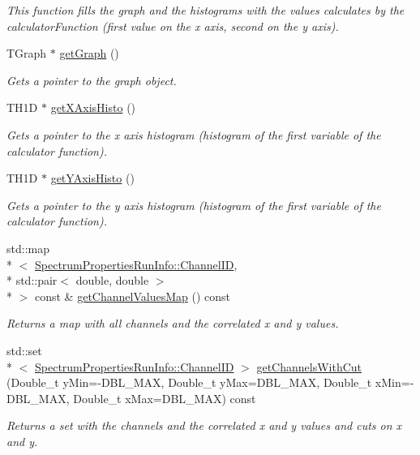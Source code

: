 \begin{DoxyCompactItemize}
\begin{DoxyCompactList}\small\item\em This function fills the graph and the histograms with the values calculates by the calculator\-Function (first value on the x axis, second on the y axis). \end{DoxyCompactList}\item 
T\-Graph $\ast$ \hyperlink{class_run_comparator_a75e708544897139bec4a7b11dc66925b}{get\-Graph} ()
\begin{DoxyCompactList}\small\item\em Gets a pointer to the graph object. \end{DoxyCompactList}\item 
T\-H1\-D $\ast$ \hyperlink{class_run_comparator_aa7db01e7789d70087584da1d3e6c281e}{get\-X\-Axis\-Histo} ()
\begin{DoxyCompactList}\small\item\em Gets a pointer to the x axis histogram (histogram of the first variable of the calculator function). \end{DoxyCompactList}\item 
T\-H1\-D $\ast$ \hyperlink{class_run_comparator_a91ce139df30b4af12e1d64d3421ff570}{get\-Y\-Axis\-Histo} ()
\begin{DoxyCompactList}\small\item\em Gets a pointer to the y axis histogram (histogram of the first variable of the calculator function). \end{DoxyCompactList}\item 
std\-::map\\*
$<$ \hyperlink{class_spectrum_properties_run_info_1_1_channel_i_d}{Spectrum\-Properties\-Run\-Info\-::\-Channel\-I\-D}, \\*
std\-::pair$<$ double, double $>$\\*
 $>$ const \& \hyperlink{class_run_comparator_a47854c2f02d9632b0c9cd004820fee20}{get\-Channel\-Values\-Map} () const 
\begin{DoxyCompactList}\small\item\em Returns a map with all channels and the correlated x and y values. \end{DoxyCompactList}\item 
std\-::set\\*
$<$ \hyperlink{class_spectrum_properties_run_info_1_1_channel_i_d}{Spectrum\-Properties\-Run\-Info\-::\-Channel\-I\-D} $>$ \hyperlink{class_run_comparator_a3d58b62450dcc496322872f01774ce68}{get\-Channels\-With\-Cut} (Double\-\_\-t y\-Min=-\/D\-B\-L\-\_\-\-M\-A\-X, Double\-\_\-t y\-Max=D\-B\-L\-\_\-\-M\-A\-X, Double\-\_\-t x\-Min=-\/D\-B\-L\-\_\-\-M\-A\-X, Double\-\_\-t x\-Max=D\-B\-L\-\_\-\-M\-A\-X) const 
\begin{DoxyCompactList}\small\item\em Returns a set with the channels and the correlated x and y values and cuts on x and y. \end{DoxyCompactList}\end{DoxyCompactItemize}
